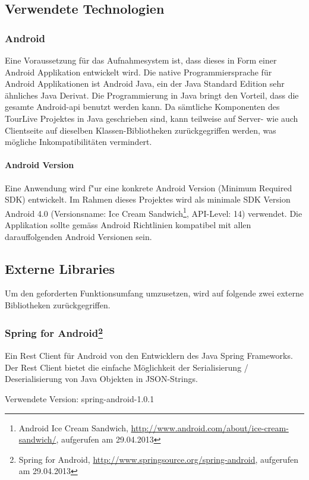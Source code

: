 \subsection{Verwendete Technologien}

\subsubsection{Android}
Eine Voraussetzung für das Aufnahmesystem ist, dass dieses in Form einer Android Applikation entwickelt wird. Die native Programmiersprache für Android Applikationen ist Android Java, ein der Java Standard Edition sehr ähnliches Java Derivat. Die Programmierung in Java bringt den Vorteil, dass die gesamte Android-\gls{api} benutzt werden kann. Da sämtliche Komponenten des TourLive Projektes in Java geschrieben sind,  kann teilweise auf Server- wie auch Clientseite auf dieselben Klassen-Bibliotheken zurückgegriffen werden, was mögliche Inkompatibilitäten vermindert. 

\paragraph{Android Version}
Eine Anwendung wird f"{u}r eine konkrete Android Version (Minimum Required SDK) entwickelt. Im Rahmen dieses Projektes wird als minimale SDK Version Android 4.0 (Versionsname: Ice Cream Sandwich\footnote{Android Ice Cream Sandwich, \url{http://www.android.com/about/ice-cream-sandwich/}, aufgerufen am 29.04.2013},  API-Level: 14) verwendet. Die Applikation sollte gemäss Android Richtlinien kompatibel mit allen darauffolgenden Android Versionen sein.

\subsection{Externe Libraries}
Um den geforderten Funktionsumfang umzusetzen, wird auf folgende zwei externe Bibliotheken zurückgegriffen.

\subsubsection{Spring for Android\footnote{Spring for Android, \url{http://www.springsource.org/spring-android}, aufgerufen am 29.04.2013} }
Ein Rest Client für Android von den Entwicklern des Java Spring Frameworks. Der Rest Client bietet die einfache Möglichkeit der Serialisierung / Deserialisierung von Java Objekten in JSON-Strings. 

Verwendete Version: spring-android-1.0.1

